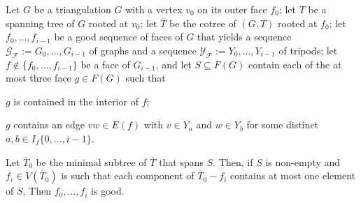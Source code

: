 \documentclass{patmorin}
\begin{document}
\begin{lem}\label{lca_sperner}
  Let $G$ be a triangulation $G$ with a vertex $v_0$ on its outer face $f_0$; let $T$ be a spanning tree of $G$ rooted at $v_0$; let $\overline{T}$ be the cotree of $(G,T)$ rooted at $f_0$; let $f_0,\ldots,f_{i-1}$ be a good sequence of faces of $G$ that yields a sequence $\mathcal{G_F}:=G_0,\ldots,G_{i-1}$ of graphs and a sequence $\mathcal{Y_F}:=Y_0,\ldots,Y_{i-1}$ of tripods; let $f\not\in \{f_0,\ldots,f_{i-1}\}$ be a face of $G_{i-1}$, and let $S\subseteq F(G)$ contain each of the at most three face $g\in F(G)$ such that
  \begin{compactenum}[(i)]
      \item $g$ is contained in the interior of $f$;
      \item $g$ contains an edge $vw\in E(f)$ with $v\in Y_a$ and $w\in Y_b$ for some distinct $a,b\in I_f\{0,\ldots,i-1\}$.
  \end{compactenum}
  Let $\overline{T}_0$ be the minimal subtree of $\overline{T}$ that spans $S$.  Then, if $S$ is non-empty and $f_i\in V(\overline{T}_0)$ is such that each component of $\overline{T}_0-f_i$ contains at most one element of $S$,
  Then $f_0,\ldots,f_i$ is good.
\end{lem}
\end{document}
